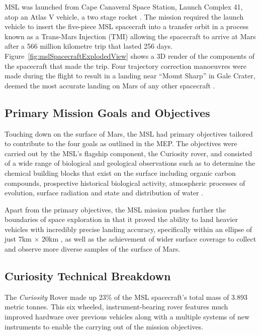       
      MSL was launched from Cape Canaveral Space Station, Launch Complex 41, atop an Atlas V vehicle, a two stage rocket \cite{harwood2014sfn}. The mission required the launch vehicle to insert the five-piece MSL spacecraft into a transfer orbit in a process known as a Trans-Mars Injection (TMI) allowing the spacecraft to arrive at Mars after a 566 million kilometre trip that lasted 256 days. Figure~\ref{fig:mslSpacecraftExplodedView} shows a 3D render of the components of the spacecraft that made the trip. Four trajectory correction manoeuvres were made during the flight to result in a landing near ``Mount Sharp'' in Gale Crater, deemed the most accurate landing on Mars of any other spacecraft \cite{martinmur}.
      
    \subsection{Primary Mission Goals and Objectives}
      Touching down on the surface of Mars, the MSL had primary objectives tailored to contribute to the four goals as outlined in the MEP. The objectives were carried out by the MSL's flagship component, the Curiosity rover, and consisted of a wide range of biological and geological observations such as to determine the chemical building blocks that exist on the surface including organic carbon compounds, prospective historical biological activity, atmospheric processes of evolution, surface radiation and state and distribution of water \cite{mslobjectivesjpl}.
      
      Apart from the primary objectives, the MSL mission pushes further the boundaries of space exploration in that it proved the ability to land heavier vehicles with incredibly precise landing accuracy, specifically within an ellipse of just 7km $\times$ 20km \cite{gwebster_2012}, as well as the achievement of wider surface coverage to collect and observe more diverse samples of the surface of Mars.
              
    \subsection{Curiosity Technical Breakdown}
      The \textit{Curiosity} Rover made up 23\% of the MSL spacecraft's total mass of 3.893 metric tonnes. This six wheeled, instrument-bearing rover features much improved hardware over previous vehicles along with a multiple systems of new instruments to enable the carrying out of the mission objectives.
      
